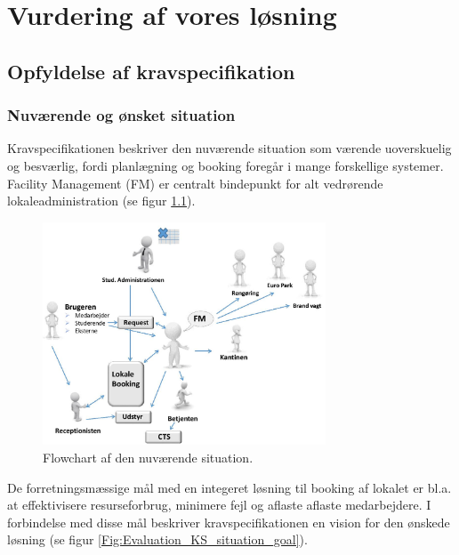 \chapter{Vurdering af vores løsning}
\label{Evaluation}
\section{Opfyldelse af kravspecifikation}
\label{Evaluation_KS}
\subsection{Nuværende og ønsket situation}
\label{Evaluation_KS_situation}
Kravspecifikationen beskriver den nuværende situation som værende uoverskuelig og besværlig, fordi planlægning og booking foregår i mange forskellige systemer. Facility Management (FM) er centralt bindepunkt for alt vedrørende lokaleadministration (se figur \ref{Fig:Evaluation_KS_situation_current}). 

\begin{figure}[h!]
  \centering
    \includegraphics[width=0.75\textwidth]{Appendix/GUI-Prototype/NuvaerendeFlow}
  \caption{Flowchart af den nuværende situation\cite[s. 4]{kravspec}.}
\label{Fig:Evaluation_KS_situation_current}
\end{figure}

De forretningsmæssige mål med en integeret løsning til booking af lokalet er bl.a. at effektivisere resurseforbrug, minimere fejl og aflaste aflaste medarbejdere. I forbindelse med disse mål beskriver kravspecifikationen en vision for den ønskede løsning (se figur \ref{Fig:Evaluation_KS_situation_goal}).

